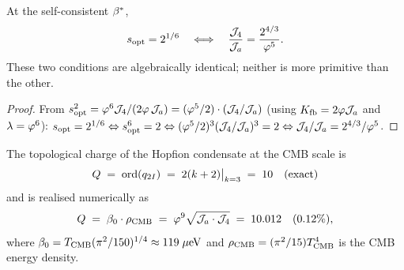 \begin{theorem}
\label{P1:thm:scale}
At the self-consistent $\beta^{*}$,
\begin{equation}
  s_{\mathrm{opt}} = 2^{1/6}
  \quad\Longleftrightarrow\quad
  \frac{\mathcal{J}_4}{\mathcal{J}_a} = \frac{2^{4/3}}{\varphi^{5}}.
  \label{P1:eq:equiv}
\end{equation}
These two conditions are algebraically identical; neither is more primitive
than the other.
\end{theorem}
\begin{proof}
From $s_{\mathrm{opt}}^{2} = \varphi^{6}\mathcal{J}_4/(2\varphi\,\mathcal{J}_a) = (\varphi^{5}/2)\cdot(\mathcal{J}_4/\mathcal{J}_a)$
(using $K_{\mathrm{fb}}=2\varphi\mathcal{J}_a$ and $\lambda=\varphi^6$):
$s_{\mathrm{opt}}=2^{1/6}\Leftrightarrow s_{\mathrm{opt}}^{6}=2\Leftrightarrow
(\varphi^{5}/2)^{3}(\mathcal{J}_4/\mathcal{J}_a)^{3}=2\Leftrightarrow\mathcal{J}_4/\mathcal{J}_a = 2^{4/3}/\varphi^{5}$.
\end{proof}

\begin{theorem}
\label{P1:thm:charge_q10}
The topological charge of the Hopfion condensate at the CMB scale is
\begin{equation}
  Q \;=\; \operatorname{ord}(q_{2I}) \;=\; 2(k+2)\big|_{k=3} \;=\; 10 \quad\text{(exact)}
  \label{P1:eq:Q_q10}
\end{equation}
and is realised numerically as
\begin{equation}
  Q \;=\; \beta_0\cdot\rho_{\mathrm{CMB}} \;=\; \varphi^{9}\sqrt{\mathcal{J}_a\cdot\mathcal{J}_4} \;=\; 10.012
  \quad(0.12\%),
  \label{P1:eq:br10}
\end{equation}
where $\beta_0 = T_{\mathrm{CMB}}(\pi^2/150)^{1/4} \approx 119\;\mu\mathrm{eV}$ and
$\rho_{\mathrm{CMB}} = (\pi^2/15)T_{\mathrm{CMB}}^4$ is the CMB energy density.
\end{theorem}

